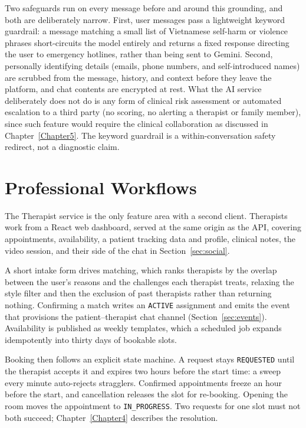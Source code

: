 Two safeguards run on every message before and around this grounding, and both are deliberately narrow. First, user messages pass a lightweight keyword guardrail: a message matching a small list of Vietnamese self-harm or violence phrases short-circuits the model entirely and returns a fixed response directing the user to emergency hotlines, rather than being sent to Gemini. Second, personally identifying details (emails, phone numbers, and self-introduced names) are scrubbed from the message, history, and context before they leave the platform, and chat contents are encrypted at rest. What the AI service deliberately does not do is any form of clinical risk assessment or automated escalation to a third party (no scoring, no alerting a therapist or family member), since such feature would require the clinical collaboration as discussed in Chapter~\ref{Chapter5}. The keyword guardrail is a within-conversation safety redirect, not a diagnostic claim.

\section{Professional Workflows}
\label{sec:professional}

The Therapist service is the only feature area with a second client. Therapists
work from a React web dashboard, served at the same origin as the API, covering
appointments, availability, a patient tracking data and profile, clinical notes, the
video session, and their side of the chat in Section~\ref{sec:social}. 

A short intake form drives matching, which ranks
therapists by the overlap between the user's reasons and the challenges each
therapist treats, relaxing the style filter and then the exclusion of past
therapists rather than returning nothing. Confirming a match writes an
\texttt{ACTIVE} assignment and emits the event that provisions the
patient--therapist chat channel (Section~\ref{sec:events}). Availability is
published as weekly templates, which a scheduled job expands idempotently into
thirty days of bookable slots.

Booking then follows an explicit state machine. A request stays
\texttt{REQUESTED} until the therapist accepts it and expires two hours before
the start time: a sweep every minute auto-rejects stragglers. Confirmed appointments freeze an hour before the
start, and cancellation releases the slot for re-booking. Opening the room
moves the appointment to \texttt{IN\_PROGRESS}. Two requests for one slot must
not both succeed; Chapter~\ref{Chapter4} describes the resolution.

